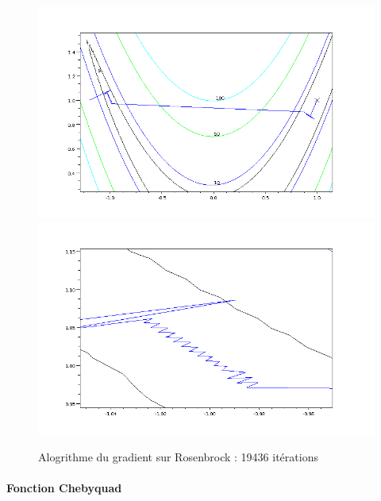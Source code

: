 \begin{figure}[h]
\caption{Alogrithme du gradient sur Rosenbrock : 19436 it\'erations}
\includegraphics[scale=0.3]{figures/gradient.png}
\includegraphics[scale=0.3]{figures/gradientzoom.png}
\end{figure}




\paragraph{Fonction Chebyquad}

